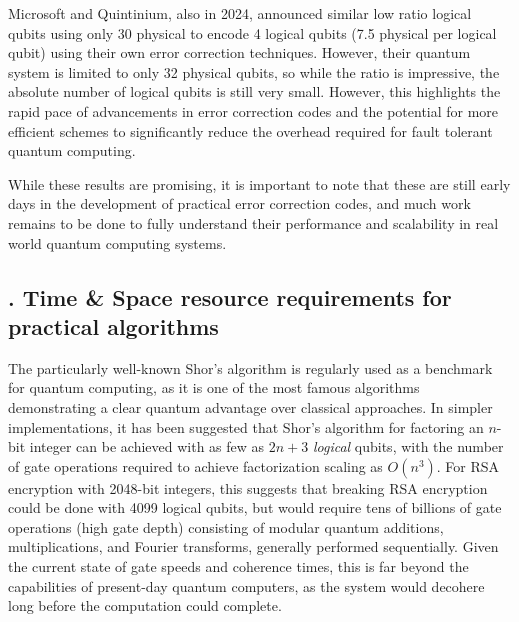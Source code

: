 \documentclass{elbioimp2}
\begin{document}
Microsoft and Quintinium, also in 2024, announced similar low ratio logical qubits using only 30 physical to encode 4 logical qubits (7.5 physical per logical qubit) using their own error correction techniques. However, their quantum system is limited to only 32 physical qubits, so while the ratio is impressive, the absolute number of logical qubits is still very small\cite{paetznick2024demonstrationlogicalqubitsrepeated}. However, this highlights the rapid pace of advancements in error correction codes and the potential for more efficient schemes to significantly reduce the overhead required for fault tolerant quantum computing.

While these results are promising, it is important to note that these are still early days in the development of practical error correction codes, and much work remains to be done to fully understand their performance and scalability in real world quantum computing systems.

\subsection{. Time \& Space resource requirements for practical algorithms}

The particularly well-known Shor’s algorithm is regularly used as a benchmark for quantum computing, as it is one of the most famous algorithms demonstrating a clear quantum advantage over classical approaches. In simpler implementations, it has been suggested that Shor's algorithm for factoring an $n$-bit integer can be achieved with as few as $2n+3$ \textit{logical} qubits, with the number of gate operations required to achieve factorization scaling as $O(n^3)$\cite{beauregard2003circuitshorsalgorithmusing}. For RSA encryption with 2048-bit integers, this suggests that breaking RSA encryption could be done with 4099 logical qubits, but would require tens of billions of gate operations (high gate depth) consisting of modular quantum additions, multiplications, and Fourier transforms, generally performed sequentially. Given the current state of gate speeds and coherence times, this is far beyond the capabilities of present-day quantum computers, as the system would decohere long before the computation could complete.
\end{document}
